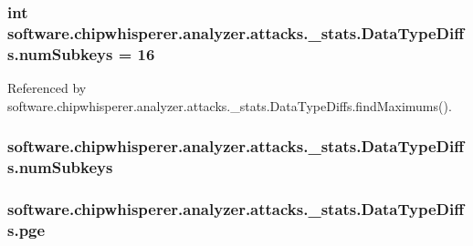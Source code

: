 \subsubsection[{num\+Subkeys}]{\setlength{\rightskip}{0pt plus 5cm}int software.\+chipwhisperer.\+analyzer.\+attacks.\+\_\+stats.\+Data\+Type\+Diffs.\+num\+Subkeys = 16\hspace{0.3cm}{\ttfamily [static]}}\label{classsoftware_1_1chipwhisperer_1_1analyzer_1_1attacks_1_1__stats_1_1DataTypeDiffs_af613b36ca707a0366fb5b15d1cf9307d}


Referenced by software.\+chipwhisperer.\+analyzer.\+attacks.\+\_\+stats.\+Data\+Type\+Diffs.\+find\+Maximums().

\hypertarget{classsoftware_1_1chipwhisperer_1_1analyzer_1_1attacks_1_1__stats_1_1DataTypeDiffs_a29918d303cff0eb584eb304338ff6291}{}
\subsubsection[{num\+Subkeys}]{\setlength{\rightskip}{0pt plus 5cm}software.\+chipwhisperer.\+analyzer.\+attacks.\+\_\+stats.\+Data\+Type\+Diffs.\+num\+Subkeys}\label{classsoftware_1_1chipwhisperer_1_1analyzer_1_1attacks_1_1__stats_1_1DataTypeDiffs_a29918d303cff0eb584eb304338ff6291}
\hypertarget{classsoftware_1_1chipwhisperer_1_1analyzer_1_1attacks_1_1__stats_1_1DataTypeDiffs_a9a6e9ed484d1856b02bac8cc19d2aa96}{}
\subsubsection[{pge}]{\setlength{\rightskip}{0pt plus 5cm}software.\+chipwhisperer.\+analyzer.\+attacks.\+\_\+stats.\+Data\+Type\+Diffs.\+pge}\label{classsoftware_1_1chipwhisperer_1_1analyzer_1_1attacks_1_1__stats_1_1DataTypeDiffs_a9a6e9ed484d1856b02bac8cc19d2aa96}



